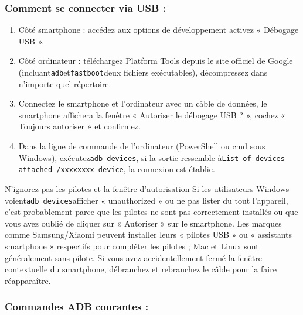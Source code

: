 \subsubsection*{Comment se connecter via USB :}

\begin{enumerate}
  \item Côté smartphone : accédez aux options de développement activez « Débogage USB ».
  \item Côté ordinateur : téléchargez Platform Tools depuis le site officiel de Google (incluant\texttt{adb}et\texttt{fastboot}deux fichiers exécutables), décompressez dans n'importe quel répertoire.
  \item Connectez le smartphone et l'ordinateur avec un câble de données, le smartphone affichera la fenêtre « Autoriser le débogage USB ? », cochez « Toujours autoriser » et confirmez.
  \item Dans la ligne de commande de l'ordinateur (PowerShell ou cmd sous Windows), exécutez\texttt{adb devices}, si la sortie ressemble à\texttt{List of devices attached /\allowbreak  xxxxxxxx device}, la connexion est établie.
\end{enumerate}

\begin{tcbwarn}{N'ignorez pas les pilotes et la fenêtre d'autorisation}
Si les utilisateurs Windows voient\texttt{adb devices}afficher « unauthorized » ou ne pas lister du tout l'appareil, c'est probablement parce que les pilotes ne sont pas correctement installés ou que vous avez oublié de cliquer sur « Autoriser » sur le smartphone. Les marques comme Samsung/Xiaomi peuvent installer leurs « pilotes USB » ou « assistants smartphone » respectifs pour compléter les pilotes ; Mac et Linux sont généralement sans pilote. Si vous avez accidentellement fermé la fenêtre contextuelle du smartphone, débranchez et rebranchez le câble pour la faire réapparaître.

\end{tcbwarn}

\subsubsection*{Commandes ADB courantes :}

